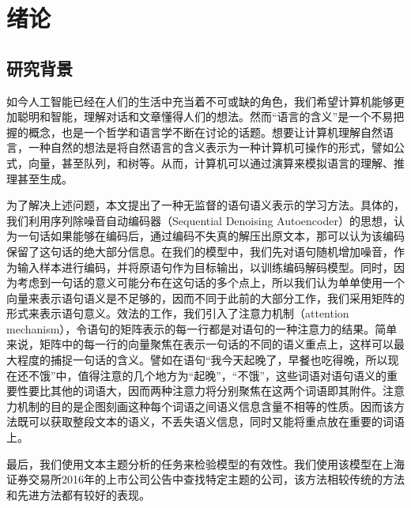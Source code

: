 \documentclass[UTF8,11pt,a4paper,nofonts]{ctexart}
\begin{document}
\newpage
\thispagestyle{empty}
\newpage
\tableofcontents
\thispagestyle{empty}

\newpage
\section{绪论}

\subsection{研究背景}
\par 如今人工智能已经在人们的生活中充当着不可或缺的角色，我们希望计算机能够更加聪明和智能，理解对话和文章懂得人们的想法。然而“语言的含义”是一个不易把握的概念，也是一个哲学和语言学不断在讨论的话题。想要让计算机理解自然语言，一种自然的想法是将自然语言的含义表示为一种计算机可操作的形式，譬如公式，向量，甚至队列，和树等。从而，计算机可以通过演算来模拟语言的理解、推理甚至生成。




为了解决上述问题，本文提出了一种无监督的语句语义表示的学习方法。具体的，我们利用序列除噪音自动编码器（Sequential Denoising Autoencoder）的思想，认为一句话如果能够在编码后，通过编码不失真的解压出原文本，那可以认为该编码保留了这句话的绝大部分信息。在我们的模型中，我们先对语句随机增加噪音，作为输入样本进行编码，并将原语句作为目标输出，以训练编码解码模型。同时，因为考虑到一句话的意义可能分布在这句话的多个点上，所以我们认为单单使用一个向量来表示语句语义是不足够的，因而不同于此前的大部分工作，我们采用矩阵的形式来表示语句意义。效法\cite{lin2017structured}的工作，我们引入了注意力机制（attention mechanism），令语句的矩阵表示的每一行都是对语句的一种注意力的结果。简单来说，矩阵中的每一行的向量聚焦在表示一句话的不同的语义重点上，这样可以最大程度的捕捉一句话的含义。譬如在语句“我今天起晚了，早餐也吃得晚，所以现在还不饿”中，值得注意的几个地方为“起晚”，“不饿”，这些词语对语句语义的重要性要比其他的词语大，因而两种注意力将分别聚焦在这两个词语即其附件。注意力机制的目的是企图刻画这种每个词语之间语义信息含量不相等的性质。因而该方法既可以获取整段文本的语义，不丢失语义信息，同时又能将重点放在重要的词语上。

最后，我们使用文本主题分析的任务来检验模型的有效性。我们使用该模型在上海证券交易所2016年的上市公司公告中查找特定主题的公司，该方法相较传统的方法和先进方法都有较好的表现。
\end{document}
